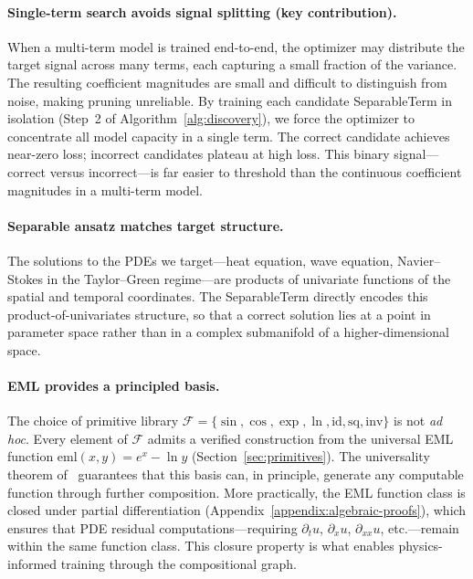 \paragraph{Single-term search avoids signal splitting (key contribution).}
When a multi-term model is trained end-to-end, the optimizer may distribute
the target signal across many terms, each capturing a small fraction
of the variance.  The resulting coefficient magnitudes are small and
difficult to distinguish from noise, making pruning unreliable.
By training each candidate SeparableTerm in isolation (Step~2 of
Algorithm~\ref{alg:discovery}), we force the optimizer to concentrate
all model capacity in a single term.  The correct candidate achieves
near-zero loss; incorrect candidates plateau at high loss.
This binary signal---correct versus incorrect---is far easier to threshold
than the continuous coefficient magnitudes in a multi-term model.

\paragraph{Separable ansatz matches target structure.}
The solutions to the PDEs we target---heat equation, wave equation,
Navier--Stokes in the Taylor--Green regime---are products of univariate functions
of the spatial and temporal coordinates.  The SeparableTerm directly
encodes this product-of-univariates structure, so that a correct solution
lies at a point in parameter space rather than in a complex submanifold
of a higher-dimensional space.

\paragraph{EML provides a principled basis.}
The choice of primitive library $\mathcal{F} = \{\sin, \cos, \exp, \ln,
\mathrm{id}, \mathrm{sq}, \mathrm{inv}\}$ is not \emph{ad hoc}.
Every element of $\mathcal{F}$ admits a verified construction from the
universal EML function $\mathrm{eml}(x, y) = e^{x} - \ln y$
(Section~\ref{sec:primitives}).  The universality theorem
of~\cite{odrzywołek2026} guarantees that this basis can, in principle,
generate any computable function through further composition.
More practically, the EML function class is closed under partial
differentiation (Appendix~\ref{appendix:algebraic-proofs}), which ensures
that PDE residual computations---requiring $\partial_{t} u$, $\partial_{x} u$,
$\partial_{xx} u$, etc.---remain within the same function class.
This closure property is what enables physics-informed training through
the compositional graph.

